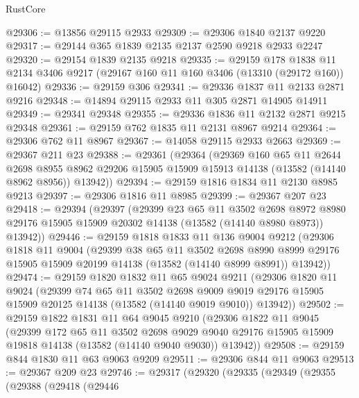 \begin{lexlean}{RustCore}
\begin{coremodule}
@29306 := @13856 @29115 @2933
@29309 := @29306 @1840 @2137 @9220
@29317 := @29144 @365 @1839 @2135 @2137 @2590 @9218 @2933 @2247
@29320 := @29154 @1839 @2135 @9218
@29335 := @29159
    @178
    @1838
    @11
    @2134
    @3406
    @9217
    (@29167 @160 @11 @160 @3406 (@13310 (@29172 @160)) @16042)
@29336 := @29159 @306
@29341 := @29336 @1837 @11 @2133 @2871 @9216
@29348 := @14894 @29115 @2933 @11 @305 @2871 @14905 @14911
@29349 := @29341 @29348
@29355 := @29336 @1836 @11 @2132 @2871 @9215 @29348
@29361 := @29159 @762 @1835 @11 @2131 @8967 @9214
@29364 := @29306 @762 @11 @8967
@29367 := @14058 @29115 @2933 @2663
@29369 := @29367 @211 @23
@29388 := @29361
    (@29364
      (@29369
        @160
        @65
        @11
        @2644
        @2698
        @8955
        @8962
        @29206
        @15905
        @15909
        @15913
        @14138
        (@13582 (@14140 @8962 @8956))
        @13942))
@29394 := @29159 @1816 @1834 @11 @2130 @8985 @9213
@29397 := @29306 @1816 @11 @8985
@29399 := @29367 @207 @23
@29418 := @29394
    (@29397
      (@29399
        @23
        @65
        @11
        @3502
        @2698
        @8972
        @8980
        @29176
        @15905
        @15909
        @20302
        @14138
        (@13582 (@14140 @8980 @8973))
        @13942))
@29446 := @29159
    @1818
    @1833
    @11
    @136
    @9004
    @9212
    (@29306
      @1818
      @11
      @9004
      (@29399
        @38
        @65
        @11
        @3502
        @2698
        @8990
        @8999
        @29176
        @15905
        @15909
        @20199
        @14138
        (@13582 (@14140 @8999 @8991))
        @13942))
@29474 := @29159
    @1820
    @1832
    @11
    @65
    @9024
    @9211
    (@29306
      @1820
      @11
      @9024
      (@29399
        @74
        @65
        @11
        @3502
        @2698
        @9009
        @9019
        @29176
        @15905
        @15909
        @20125
        @14138
        (@13582 (@14140 @9019 @9010))
        @13942))
@29502 := @29159
    @1822
    @1831
    @11
    @64
    @9045
    @9210
    (@29306
      @1822
      @11
      @9045
      (@29399
        @172
        @65
        @11
        @3502
        @2698
        @9029
        @9040
        @29176
        @15905
        @15909
        @19818
        @14138
        (@13582 (@14140 @9040 @9030))
        @13942))
@29508 := @29159 @844 @1830 @11 @63 @9063 @9209
@29511 := @29306 @844 @11 @9063
@29513 := @29367 @209 @23
@29746 := @29317
    (@29320
      (@29335
        (@29349
          (@29355
            (@29388
              (@29418
                (@29446

\end{coremodule}
\end{lexlean}
